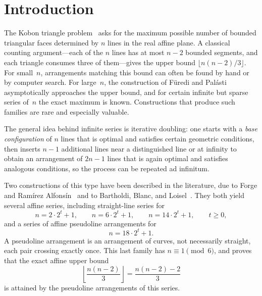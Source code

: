 \section{Introduction}

The Kobon triangle problem~\cite{oeis} asks for the maximum possible number of bounded triangular
faces determined by $n$ lines in the real affine plane. A classical
counting argument---each of the $n$ lines has at most $n-2$ bounded segments,
and each triangle consumes three of them---gives the upper bound
$\lfloor n(n-2)/3 \rfloor$.
For small~$n$, arrangements matching this bound can often be found by hand or
by computer search. For large~$n$, the construction of F{\"u}redi and
Pal{\'a}sti~\cite{furedi1984} asymptotically approaches the upper bound, and for
certain infinite but sparse series of~$n$ the exact maximum is known.
Constructions that produce such families are rare and especially valuable.

The general idea behind infinite series is iterative doubling: one
starts with a \emph{base configuration} of $n$ lines that is optimal and
satisfies certain geometric conditions, then inserts $n-1$ additional lines
near a distinguished line or at infinity to obtain an arrangement of $2n-1$ lines
that is again optimal and satisfies analogous conditions,
so the process can be repeated ad infinitum.

Two constructions of this type have been described in the literature,
due to Forge and Ram{\'i}rez Alfons{\'i}n~\cite{forge1998} and to
Bartholdi, Blanc, and Loisel~\cite{bartholdi2007}. They both yield several
affine series, including straight-line series for
\begin{equation}\label{eq:known-series}
  n = 2\cdot 2^t + 1,
  \qquad
  n = 6\cdot 2^t + 1,
  \qquad
  n = 14\cdot 2^t + 1,
  \qquad t\ge 0,
\end{equation}
and a series of affine pseudoline arrangements for
\begin{equation*}
  n = 18\cdot 2^t + 1.
\end{equation*}
A pseudoline arrangement is an arrangement of curves, not necessarily
straight, each pair crossing exactly once.
This last family has $n\equiv 1\pmod 6$, and
\cite[Theorem~1.3]{bartholdi2007} proves that the exact affine upper
bound
\begin{equation*}
  \left\lfloor \frac{n(n-2)}{3}\right\rfloor
  =
  \frac{n(n-2)-2}{3}
\end{equation*}
is attained by the pseudoline arrangements of this series.

